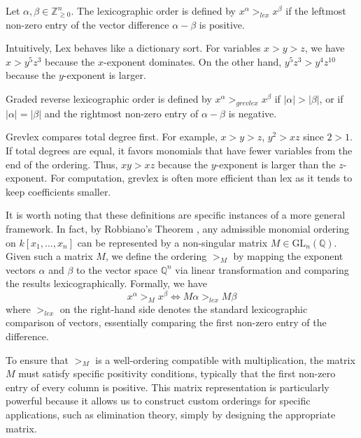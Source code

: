 \begin{definition}
\label{def:lex_order}
Let $\alpha, \beta \in \mathbb{Z}_{\ge 0}^n$. The lexicographic order is defined by  $x^\alpha >_{lex} x^\beta$ if the leftmost non-zero entry of the vector difference $\alpha - \beta$ is positive.
\end{definition}
Intuitively, Lex behaves like a dictionary sort. For variables $x > y > z$, we have $x > y^5 z^3$ because the $x$-exponent dominates. On the other hand, $y^5 z^3 > y^4 z^{10}$ because the $y$-exponent is larger.

\begin{definition}
\label{def:grevlex_order}
Graded reverse lexicographic order is defined by $x^\alpha >_{grevlex} x^\beta$ if $|\alpha| > |\beta|$, or if $|\alpha| = |\beta|$ and the rightmost non-zero entry of $\alpha - \beta$ is negative.
\end{definition}
Grevlex compares total degree first. For example, $x>y>z$, $y^2 > x z$ since $2 > 1$. If total degrees are equal, it favors monomials that have fewer variables from the end of the ordering. Thus, $x y > x z$ because the $y$-exponent is larger than the $z$-exponent. For computation, grevlex is often more efficient than lex as it tends to keep coefficients smaller.

It is worth noting that these definitions are specific instances of a more general framework. In fact, by Robbiano's Theorem \cite{Robbiano1986_TheoryOfGradedStructures}, any admissible monomial ordering on $k[x_1, \dots, x_n]$ can be represented by a non-singular matrix $M \in \text{GL}_n(\mathbb{Q})$. Given such a matrix $M$, we define the ordering $>_M$ by mapping the exponent vectors $\alpha$ and $\beta$ to the vector space $\mathbb{Q}^n$ via linear transformation and comparing the results lexicographically. Formally, we have
$$
x^\alpha >_M x^\beta \iff M\alpha >_{lex} M\beta
$$
where $>_{lex}$ on the right-hand side denotes the standard lexicographic comparison of vectors, essentially comparing the first non-zero entry of the difference.

To ensure that $>_M$ is a well-ordering compatible with multiplication, the matrix $M$ must satisfy specific positivity conditions, typically that the first non-zero entry of every column is positive. This matrix representation is particularly powerful because it allows us to construct custom orderings for specific applications, such as elimination theory, simply by designing the appropriate matrix.

